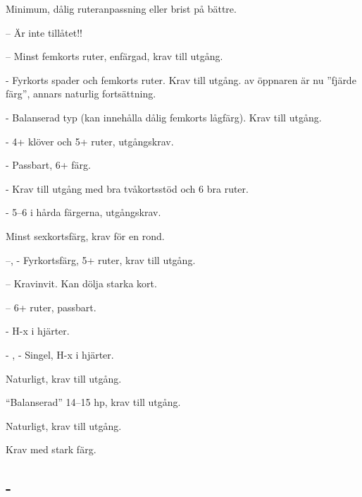 \begin{beskriv}
   \item[\ru{2}] Minimum, dålig ruteranpassning eller brist på bättre.
   \begin{beskriv}
	\item[--\pass] Är inte tillåtet!!
	\item[--\hj{2}] Minst femkorts ruter, enfärgad, krav till
                        utgång.
	\item[- \spa{2}] Fyrkorts spader och femkorts ruter. Krav till utgång.
			 av öppnaren är nu ''fjärde färg'', annars
			naturlig fortsättning.
	\item[- \NT{2}] Balanserad typ (kan innehålla dålig femkorts
                        lågfärg). Krav till utgång.
	\item[- \kl{3}] 4+ klöver och 5+ ruter, utgångskrav.
	\item[- \ru{3}] Passbart, 6+ färg.
	\item[- \hj{3}] Krav till utgång med bra tvåkortsstöd och 6 bra ruter.
	\item[- \spa{3}] 5--6 i hårda färgerna, utgångskrav.
   \end{beskriv}
   \item[\hj{2}] Minst sexkortsfärg, krav för en rond.
		\begin{beskriv}
		   \item[--\spa{2}, - \kl{3}] Fyrkortsfärg, 5+ ruter,
			krav till utgång.
		   \item[--\NT{2}] Kravinvit. Kan dölja starka kort.
		   \item[--\ru{3}] 6+ ruter, passbart. 
		   \item[- \hj{3}] H-x i hjärter.
		   \item[- \spa{3}, - \kl{4}] Singel, H-x i hjärter.
		\end{beskriv}
   \item[\spa{2}] Naturligt, krav till utgång.
   \item[\NT{2}] ``Balanserad'' 14--15 hp, krav till utgång.
   \item[\la{3}] Naturligt, krav till utgång.
   \item[\hj{3}] Krav med stark färg.
\end{beskriv}

\subsection{ - }

